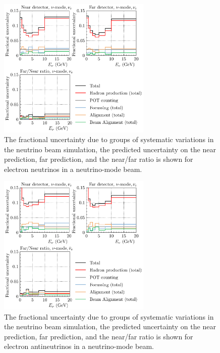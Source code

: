 \documentclass{article}
\begin{document}
\begin{figure}
  \centering
  \includegraphics[width=0.65\textwidth]{plots/fracerrs/numode_nue_ErrType}
  \caption{The fractional uncertainty due to groups of systematic variations in the neutrino beam simulation, the predicted uncertainty on the near prediction, far prediction, and the near/far ratio is shown for electron neutrinos in a neutrino-mode beam.}
  \label{fig:grp_nu_nue}
\end{figure}

\begin{figure}
  \centering
  \includegraphics[width=0.65\textwidth]{plots/fracerrs/numode_nuebar_ErrType}
  \caption{The fractional uncertainty due to groups of systematic variations in the neutrino beam simulation, the predicted uncertainty on the near prediction, far prediction, and the near/far ratio is shown for electron antineutrinos in a neutrino-mode beam.}
  \label{fig:grp_nu_nuebar}
\end{figure}
\end{document}
